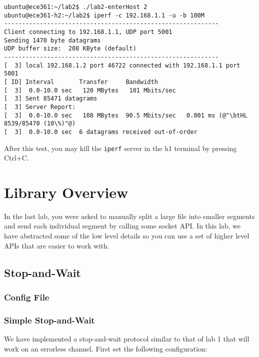 \documentclass[11pt]{article}
\begin{document}
\begin{lstlisting}[style=ece361shell, caption={Running an \texttt{iperf} client in h2.}, label={lst:iperf-client}]
ubuntu@ece361:~/lab2$ ./lab2-enterHost 2
ubuntu@ece361-h2:~/lab2$ iperf -c 192.168.1.1 -u -b 100M
------------------------------------------------------------
Client connecting to 192.168.1.1, UDP port 5001
Sending 1470 byte datagrams
UDP buffer size:  208 KByte (default)
------------------------------------------------------------
[  3] local 192.168.1.2 port 46722 connected with 192.168.1.1 port 5001
[ ID] Interval       Transfer     Bandwidth
[  3]  0.0-10.0 sec   120 MBytes   101 Mbits/sec
[  3] Sent 85471 datagrams
[  3] Server Report:
[  3]  0.0-10.0 sec   108 MBytes  90.5 Mbits/sec   0.001 ms (@"\btHL 8539/85470 (10\%)"@)
[  3]  0.0-10.0 sec  6 datagrams received out-of-order
\end{lstlisting}

After this test, you may kill the \texttt{iperf} server in the h1 terminal by pressing Ctrl+C.


\section{Library Overview}
In the last lab, you were asked to manually split a large file into smaller segments and send each individual segment by calling some socket API. In this lab, we have abstracted some of the low level details so you can use a set of higher level APIs that are easier to work with.

\subsection{Stop-and-Wait}
\subsubsection{Config File}


\subsubsection{Simple Stop-and-Wait}
We have implemented a stop-and-wait protocol similar to that of lab 1 that will work on an errorless channel. First set the following configuration:
\end{document}
